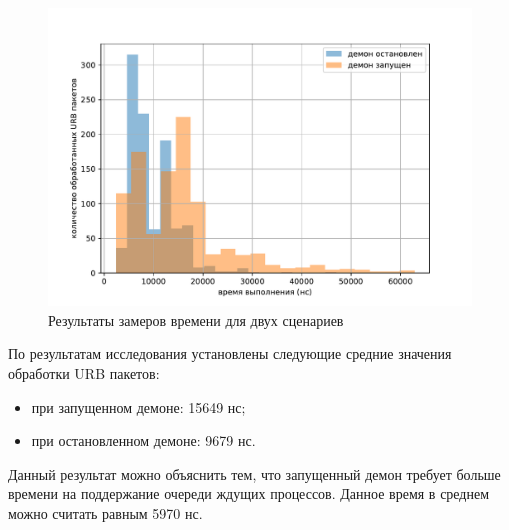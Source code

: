 \clearpage

\begin{figure}[ht]
    \centering
    \includegraphics[width=\linewidth]{img/figure.pdf}
    \caption{Результаты замеров времени для двух сценариев}
    \label{fig:result}
\end{figure}

По результатам исследования установлены следующие средние значения обработки URB пакетов:

\begin{itemize}[leftmargin=1.6\parindent]
    \item при запущенном демоне: 15649 нс;
    \item при остановленном демоне: 9679 нс.
\end{itemize}

Данный результат можно объяснить тем, что запущенный демон требует больше времени на поддержание очереди ждущих процессов. Данное время в среднем можно считать равным 5970 нс.

\pagebreak
